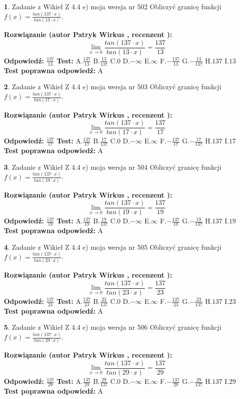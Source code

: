 \documentclass[12pt, a4paper]{article}
\theoremstyle{definition} %
\newtheorem{zad}{}
\newcommand{\zadStart}[1]{\begin{zad}#1\newline}
\newcommand{\zadStop}{\end{zad}}
\newcommand{\rozwStart}[2]{\noindent \textbf{Rozwiązanie (autor #1 , recenzent #2): }\newline}
\newcommand{\rozwStop}{\newline}
\newcommand{\odpStart}{\noindent \textbf{Odpowiedź:}\newline}
\newcommand{\odpStop}{\newline}
\newcommand{\testStart}{\noindent \textbf{Test:}\newline}
\newcommand{\testStop}{\newline}
\newcommand{\kluczStart}{\noindent \textbf{Test poprawna odpowiedź:}\newline}
\newcommand{\kluczStop}{\newline}
\begin{document}
\zadStart{Zadanie z Wikieł Z 4.4 e) moja wersja nr 502}
Obliczyć granicę funkcji $f(x)=\frac{tan(137\cdot x)}{tan(13\cdot x)}$.
\zadStop
\rozwStart{Patryk Wirkus}{}
$$\lim\limits_{x\to 0}\frac{tan(137\cdot x)}{tan(13\cdot x)}=
\frac{137}{13}$$
\rozwStop
\odpStart
$\frac{137}{13}$
\odpStop
\testStart
A.$\frac{137}{13}$
B.$\frac{13}{137}$
C.$0$
D.$-\infty$
E.$\infty$
F.$-\frac{137}{13}$
G.$-\frac{13}{137}$
H.$137$
I.$13$
\testStop
\kluczStart
A
\kluczStop



\zadStart{Zadanie z Wikieł Z 4.4 e) moja wersja nr 503}
Obliczyć granicę funkcji $f(x)=\frac{tan(137\cdot x)}{tan(17\cdot x)}$.
\zadStop
\rozwStart{Patryk Wirkus}{}
$$\lim\limits_{x\to 0}\frac{tan(137\cdot x)}{tan(17\cdot x)}=
\frac{137}{17}$$
\rozwStop
\odpStart
$\frac{137}{17}$
\odpStop
\testStart
A.$\frac{137}{17}$
B.$\frac{17}{137}$
C.$0$
D.$-\infty$
E.$\infty$
F.$-\frac{137}{17}$
G.$-\frac{17}{137}$
H.$137$
I.$17$
\testStop
\kluczStart
A
\kluczStop



\zadStart{Zadanie z Wikieł Z 4.4 e) moja wersja nr 504}
Obliczyć granicę funkcji $f(x)=\frac{tan(137\cdot x)}{tan(19\cdot x)}$.
\zadStop
\rozwStart{Patryk Wirkus}{}
$$\lim\limits_{x\to 0}\frac{tan(137\cdot x)}{tan(19\cdot x)}=
\frac{137}{19}$$
\rozwStop
\odpStart
$\frac{137}{19}$
\odpStop
\testStart
A.$\frac{137}{19}$
B.$\frac{19}{137}$
C.$0$
D.$-\infty$
E.$\infty$
F.$-\frac{137}{19}$
G.$-\frac{19}{137}$
H.$137$
I.$19$
\testStop
\kluczStart
A
\kluczStop



\zadStart{Zadanie z Wikieł Z 4.4 e) moja wersja nr 505}
Obliczyć granicę funkcji $f(x)=\frac{tan(137\cdot x)}{tan(23\cdot x)}$.
\zadStop
\rozwStart{Patryk Wirkus}{}
$$\lim\limits_{x\to 0}\frac{tan(137\cdot x)}{tan(23\cdot x)}=
\frac{137}{23}$$
\rozwStop
\odpStart
$\frac{137}{23}$
\odpStop
\testStart
A.$\frac{137}{23}$
B.$\frac{23}{137}$
C.$0$
D.$-\infty$
E.$\infty$
F.$-\frac{137}{23}$
G.$-\frac{23}{137}$
H.$137$
I.$23$
\testStop
\kluczStart
A
\kluczStop



\zadStart{Zadanie z Wikieł Z 4.4 e) moja wersja nr 506}
Obliczyć granicę funkcji $f(x)=\frac{tan(137\cdot x)}{tan(29\cdot x)}$.
\zadStop
\rozwStart{Patryk Wirkus}{}
$$\lim\limits_{x\to 0}\frac{tan(137\cdot x)}{tan(29\cdot x)}=
\frac{137}{29}$$
\rozwStop
\odpStart
$\frac{137}{29}$
\odpStop
\testStart
A.$\frac{137}{29}$
B.$\frac{29}{137}$
C.$0$
D.$-\infty$
E.$\infty$
F.$-\frac{137}{29}$
G.$-\frac{29}{137}$
H.$137$
I.$29$
\testStop
\kluczStart
A
\kluczStop
\end{document}
